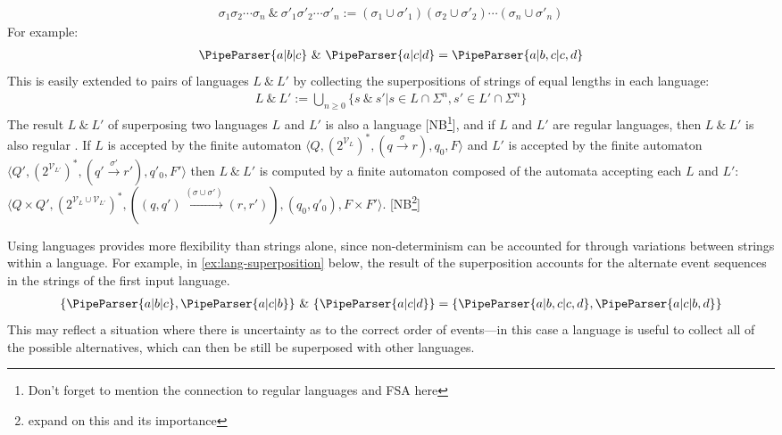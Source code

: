 \documentclass[a4paper,12pt,leqno]{article}
\newcommand{\vph}[1]{\vphantom{#1}}
\newcommand{\sta}[2]{\stackrel{#1}{#2}}
\newcommand{\ebox}[1]{\fbox{$\vph{'(),}#1$}}
\renewcommand{\sp}{~\&~}
\newcommand{\EventString}[1]{%
	\renewcommand*{\do}[1]{\ebox{##1}}%
	\PipeParser{#1}%
}
\newcommand{\selfnote}[1]{{\color{red}[NB\footnote{{\color{red}#1}}]}}
\newcommand{\nb}{\selfnote}
\begin{document}
\begin{align}\label{def:superposition}
	\sigma_1\sigma_2\cdots\sigma_n \sp \sigma'_1\sigma'_2\cdots\sigma'_n := (\sigma_1 \cup \sigma'_1)(\sigma_2 \cup \sigma'_2)\cdots(\sigma_n \cup \sigma'_n)
\end{align}
For example:
\begin{align}\label{ex:superposition}
	\EventString{a|b|c} \sp{} \EventString{a|c|d} = \EventString{a|b,c|c,d}
\end{align}
This is easily extended to pairs of languages $L \sp L'$ by collecting the superpositions of strings of equal lengths in each language:
\begin{align}\label{def:lang-superposition}
	L \sp L' := \bigcup_{n \ge 0}\{ s \sp s' | s \in L \cap \Sigma^n, s' \in L' \cap \Sigma^n\}
\end{align}
The result $L \sp L'$ of superposing two languages $L$ and $L'$ is also a language \nb{Don't forget to mention the connection to regular languages and FSA here}, and if $L$ and $L'$ are regular languages, then $L \sp L'$ is also regular \citep[p. 126]{woods2017towards}. If $L$ is accepted by the finite automaton $\langle Q, (2^{\mathcal{V}_{L}})^*, (q \sta{\sigma}{\to} r), q_0, F \rangle$ and $L'$ is accepted by the finite automaton $\langle Q', (2^{\mathcal{V}_{L'}})^*, (q' \sta{\sigma'}{\to} r'), q'_0, F' \rangle$ then $L \sp L'$ is computed by a finite automaton composed of the automata accepting each $L$ and $L'$: $\langle Q \times Q', (2^{\mathcal{V}_L \cup \mathcal{V}_{L'}})^*, ((q, q') \sta{(\sigma \cup \sigma')}{\to} (r, r')), (q_0, q'_0), F \times F' \rangle$. \nb{expand on this and its importance}

Using languages provides more flexibility than strings alone, since non-determinism can be accounted for through variations between strings within a language. For example, in \cref{ex:lang-superposition} below, the result of the superposition accounts for the alternate event sequences in the strings of the first input language.
\begin{align}\label{ex:lang-superposition}
	\{\EventString{a|b|c}, \EventString{a|c|b}\} \sp \{\EventString{a|c|d}\} = \{\EventString{a|b,c|c,d}, \EventString{a|c|b,d}\}
\end{align}
This may reflect a situation where there is uncertainty as to the correct order of events---in this case a language is useful to collect all of the possible alternatives, which can then be still be superposed with other languages. 
\end{document}
